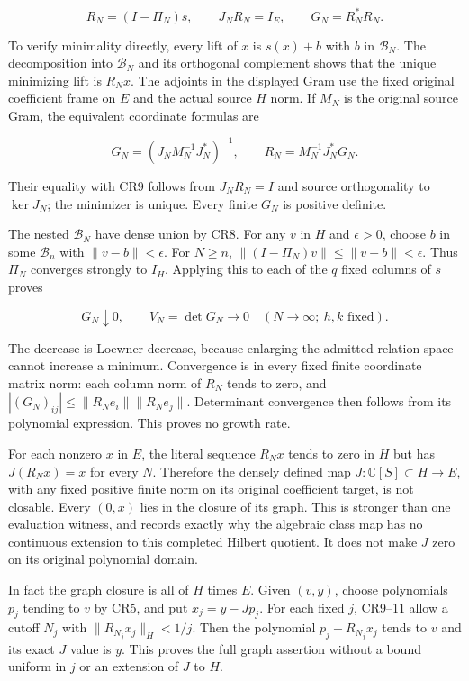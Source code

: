 \[
R_N=(I-\Pi_N)s,\qquad J_NR_N=I_E,\qquad
G_N=R_N^*R_N.
\tag{CR9}
\]

To verify minimality directly, every lift of \(x\) is \(s(x)+b\) with \(b\) in \(\mathcal B_N\). The decomposition into \(\mathcal B_N\) and its orthogonal complement shows that the unique minimizing lift is \(R_Nx\). The adjoints in the displayed Gram use the fixed original coefficient frame on \(E\) and the actual source \(H\) norm. If \(M_N\) is the original source Gram, the equivalent coordinate formulas are

\[
G_N=(J_NM_N^{-1}J_N^*)^{-1},\qquad
R_N=M_N^{-1}J_N^*G_N.
\tag{CR10}
\]

Their equality with CR9 follows from \(J_NR_N=I\) and source orthogonality to \(\ker J_N\); the minimizer is unique. Every finite \(G_N\) is positive definite.

The nested \(\mathcal B_N\) have dense union by CR8. For any \(v\) in \(H\) and \(\epsilon>0\), choose \(b\) in some \(\mathcal B_n\) with \(\|v-b\|<\epsilon\). For \(N\ge n\), \(\|(I-\Pi_N)v\|\le\|v-b\|<\epsilon\). Thus \(\Pi_N\) converges strongly to \(I_H\). Applying this to each of the \(q\) fixed columns of \(s\) proves

\[
\boxed{G_N\downarrow0,\qquad V_N=\det G_N\longrightarrow0
\quad(N\longrightarrow\infty;\ h,k\text{ fixed}).}
\tag{CR11}
\]

The decrease is Loewner decrease, because enlarging the admitted relation space cannot increase a minimum. Convergence is in every fixed finite coordinate matrix norm: each column norm of \(R_N\) tends to zero, and \(|(G_N)_{ij}|\le\|R_Ne_i\|\|R_Ne_j\|\). Determinant convergence then follows from its polynomial expression. This proves no growth rate.

For each nonzero \(x\) in \(E\), the literal sequence \(R_Nx\) tends to zero in \(H\) but has \(J(R_Nx)=x\) for every \(N\). Therefore the densely defined map \(J:\mathbb C[S]\subset H\to E\), with any fixed positive finite norm on its original coefficient target, is not closable. Every \((0,x)\) lies in the closure of its graph. This is stronger than one evaluation witness, and records exactly why the algebraic class map has no continuous extension to this completed Hilbert quotient. It does not make \(J\) zero on its original polynomial domain.

In fact the graph closure is all of \(H\) times \(E\). Given \((v,y)\), choose polynomials \(p_j\) tending to \(v\) by CR5, and put \(x_j=y-Jp_j\). For each fixed \(j\), CR9--11 allow a cutoff \(N_j\) with \(\|R_{N_j}x_j\|_H<1/j\). Then the polynomial \(p_j+R_{N_j}x_j\) tends to \(v\) and its exact \(J\) value is \(y\). This proves the full graph assertion without a bound uniform in \(j\) or an extension of \(J\) to \(H\).

